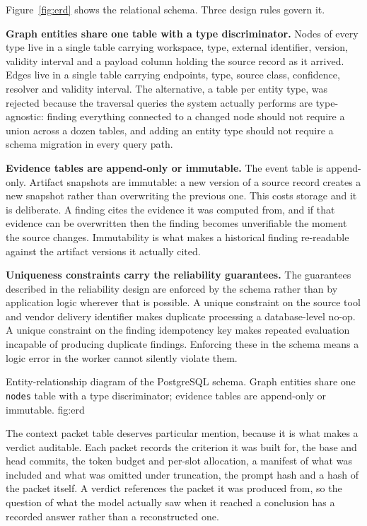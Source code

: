 Figure~\ref{fig:erd} shows the relational schema. Three design rules govern it.

\textbf{Graph entities share one table with a type discriminator.} Nodes of
every type live in a single table carrying workspace, type, external identifier,
version, validity interval and a payload column holding the source record as it
arrived. Edges live in a single table carrying endpoints, type, source class,
confidence, resolver and validity interval. The alternative, a table per entity
type, was rejected because the traversal queries the system actually performs
are type-agnostic: finding everything connected to a changed node should not
require a union across a dozen tables, and adding an entity type should not
require a schema migration in every query path.

\textbf{Evidence tables are append-only or immutable.} The event table is
append-only. Artifact snapshots are immutable: a new version of a source record
creates a new snapshot rather than overwriting the previous one. This costs
storage and it is deliberate. A finding cites the evidence it was computed from,
and if that evidence can be overwritten then the finding becomes unverifiable
the moment the source changes. Immutability is what makes a historical finding
re-readable against the artifact versions it actually cited.

\textbf{Uniqueness constraints carry the reliability guarantees.} The guarantees
described in the reliability design are enforced by the schema rather than by
application logic wherever that is possible. A unique constraint on the source
tool and vendor delivery identifier makes duplicate processing a database-level
no-op. A unique constraint on the finding idempotency key makes repeated
evaluation incapable of producing duplicate findings. Enforcing these in the
schema means a logic error in the worker cannot silently violate them.

\lsfigure{}
  {Entity-relationship diagram of the PostgreSQL schema. Graph entities
           share one \texttt{nodes} table with a type discriminator; evidence
           tables are append-only or immutable.}
  {fig:erd}

The context packet table deserves particular mention, because it is what makes a
verdict auditable. Each packet records the criterion it was built for, the base
and head commits, the token budget and per-slot allocation, a manifest of what
was included and what was omitted under truncation, the prompt hash and a hash
of the packet itself. A verdict references the packet it was produced from, so
the question of what the model actually saw when it reached a conclusion has a
recorded answer rather than a reconstructed one.

